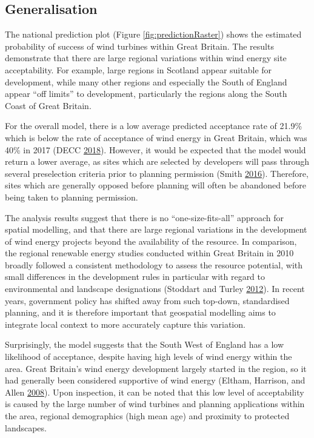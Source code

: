 \documentclass[a4paper,]{article}
\theoremstyle{definition}
\theoremstyle{definition}
\theoremstyle{definition}
\theoremstyle{remark}
\begin{document}
\hypertarget{generalisation-1}{%
\subsection{Generalisation}\label{generalisation-1}}

The national prediction plot (Figure \ref{fig:predictionRaster}) shows
the estimated probability of success of wind turbines within Great
Britain. The results demonstrate that there are large regional
variations within wind energy site acceptability. For example, large
regions in Scotland appear suitable for development, while many other
regions and especially the South of England appear ``off limits'' to
development, particularly the regions along the South Coast of Great
Britain.

For the overall model, there is a low average predicted acceptance rate
of 21.9\% which is below the rate of acceptance of wind energy in Great
Britain, which was 40\% in 2017 (DECC
\protect\hyperlink{ref-DECC2018}{2018}). However, it would be expected
that the model would return a lower average, as sites which are selected
by developers will pass through several preselection criteria prior to
planning permission (Smith \protect\hyperlink{ref-Smith2016}{2016}).
Therefore, sites which are generally opposed before planning will often
be abandoned before being taken to planning permission.

The analysis results suggest that there is no ``one-size-fits-all''
approach for spatial modelling, and that there are large regional
variations in the development of wind energy projects beyond the
availability of the resource. In comparison, the regional renewable
energy studies conducted within Great Britain in 2010 broadly followed a
consistent methodology to assess the resource potential, with small
differences in the development rules in particular with regard to
environmental and landscape designations (Stoddart and Turley
\protect\hyperlink{ref-Stoddart2012}{2012}). In recent years, government
policy has shifted away from such top-down, standardised planning, and
it is therefore important that geospatial modelling aims to integrate
local context to more accurately capture this variation.

Surprisingly, the model suggests that the South West of England has a
low likelihood of acceptance, despite having high levels of wind energy
within the area. Great Britain's wind energy development largely started
in the region, so it had generally been considered supportive of wind
energy (Eltham, Harrison, and Allen
\protect\hyperlink{ref-Eltham2008}{2008}). Upon inspection, it can be
noted that this low level of acceptability is caused by the large number
of wind turbines and planning applications within the area, regional
demographics (high mean age) and proximity to protected landscapes.
\end{document}
